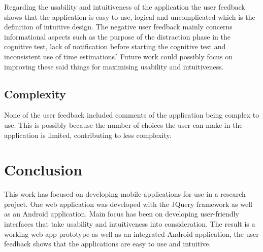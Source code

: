 \documentclass{article}
\begin{document}
Regarding the usability and intuitiveness of the application the user feedback shows that the application is easy to use, logical and uncomplicated which is the definition of intuitive design.\cite{galitz_essential_2007}
The negative user feedback mainly concerns informational aspects such as the purpose of the distraction phase in the cognitive test, lack of notification before starting the cognitive test and inconsistent use of time estimations.\cite{bevan_usability_1994}' Future work could possibly focus on improving these said things for maximising usability and intuitiveness.  

\subsection{Complexity}

None of the user feedback included comments of the application being complex to use. This is possibly because the number of choices the user can make in the application is limited, contributing to less complexity.\cite{comber_layout_1997} 

\section{Conclusion}

This work has focused on developing mobile applications for use in a research project. One web application was developed with the JQuery framework as well as an Android application. Main focus has been on developing user-friendly interfaces that take usability and intuitiveness into consideration. 
The result is a working web app prototype as well as an integrated Android application, the user feedback shows that the applications are easy to use and intuitive. 

\printbibliography
\end{document}

